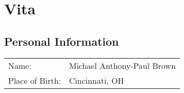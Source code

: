 \documentclass[final]{ukthesis}
\begin{document}

\mainmatter
\OnehalfSpacing


\copyrightnotice


\copyrightnotice


\copyrightnotice


\copyrightnotice


\copyrightnotice

%


\backmatter

\printbibliography[title={References}]
%
%


\chapter{Vita}

\section*{Personal Information}
\begin{tabular} {ll}
  Name: & Michael Anthony-Paul Brown \\
  Place of Birth: & Cincinnati, OH 
\end{tabular}
\end{document}
